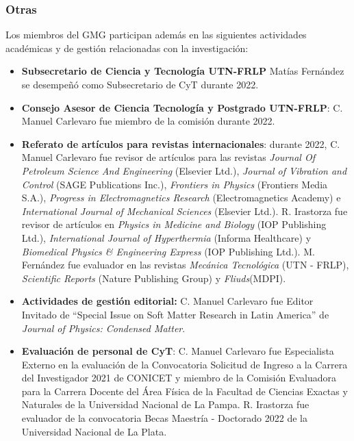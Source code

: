 \documentclass[a4paper,11pt,twoside,final,titlepage,onecolumn,openright]{report}
\begin{document}
\subsubsection{Otras}

Los miembros del GMG participan además en las siguientes actividades académicas y de gestión relacionadas con la investigación:

\begin{itemize}
    \item \textbf{Subsecretario de Ciencia y Tecnología UTN-FRLP} Matías Fernández se desempeñó como Subsecretario de CyT durante 2022.

  \item \textbf{Consejo Asesor de Ciencia Tecnología y Postgrado UTN-FRLP}: C. Manuel Carlevaro fue miembro de la comisión durante 2022. 
  
  \item \textbf{Referato de artículos para revistas internacionales}: durante 2022, C. Manuel Carlevaro fue revisor de artículos para las revistas \textit{Journal Of Petroleum Science And Engineering} (Elsevier Ltd.), \textit{Journal of Vibration and Control} (SAGE Publications Inc.), \textit{Frontiers in Physics} (Frontiers Media S.A.), \textit{Progress in Electromagnetics Research} (Electromagnetics Academy) e \textit{International Journal of Mechanical Sciences} (Elsevier Ltd.). R. Irastorza fue revisor de artículos en \textit{Physics in Medicine and Biology} (IOP Publishing Ltd.), \textit{International Journal of Hyperthermia} (Informa Healthcare) y \textit{Biomedical Physics \& Engineering Express} (IOP Publishing Ltd.). M. Fernández fue evaluador en las revistas \textit{Mecánica Tecnológica} (UTN - FRLP), \textit{Scientific Reports} (Nature Publishing Group) y \textit{Fliuds}(MDPI).
 
 \item \textbf{Actividades de gestión editorial:} C. Manuel Carlevaro fue Editor Invitado de ``Special Issue on Soft Matter Research in Latin America'' de \textit{Journal of Physics: Condensed Matter}.
 
     \item \textbf{Evaluación de personal de CyT}: C. Manuel Carlevaro fue Especialista Externo en la evaluación de la Convocatoria Solicitud de Ingreso a la Carrera del Investigador 2021 de CONICET y miembro de la Comisión Evaluadora para la Carrera Docente del Área Física de la Facultad de Ciencias Exactas y Naturales de la Universidad Nacional de La Pampa. R. Irastorza fue evaluador de la convocatoria Becas Maestría - Doctorado 2022 de la Universidad Nacional de La Plata.


\end{itemize}
\end{document}
